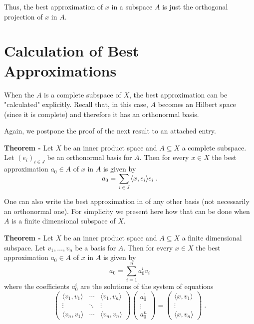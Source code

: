 \documentclass[12pt]{article}
\begin{document}
Thus, the best approximation of $x$ in a subspace $A$ is just the orthogonal projection of $x$ in $A$.

\section{Calculation of Best Approximations}
When the $A$ is a complete subspace of $X$, the best approximation can be "calculated" explicitly. Recall that, in this case, $A$ becomes an Hilbert space (since it is complete) and therefore it has an orthonormal basis.

Again, we postpone the proof of the next result to an attached entry.

{\bf Theorem -} Let $X$ be an inner product space and $A \subseteq X$ a complete subspace. Let $(e_i)_{i \in J}$ be an orthonormal basis for $A$. Then for every $x \in X$ the best approximation $a_0 \in A$ of $x$ in $A$ is given by
\begin{displaymath}
a_0= \sum_{i \in J} \langle x, e_i \rangle e_i \;.
\end{displaymath}

One can also write the best approximation in  of any other basis (not necessarily an orthonormal one). For simplicity we present here how that can be done when $A$ is a finite dimensional subspace of $X$.

{\bf Theorem -} Let $X$ be an inner product space and $A \subseteq X$ a finite dimensional subspace. Let $v_1, \dots, v_n$ be a basis for $A$. Then for every $x \in X$ the best approximation $a_0 \in A$ of $x$ in $A$ is given by
\begin{displaymath}
a_0 = \sum_{i=1}^{n} a_0^i v_i
\end{displaymath}
where the coefficients $a_0^i$ are the solutions of the system of equations
\begin{displaymath}
\begin{pmatrix}
\langle v_1, v_1 \rangle & \cdots & \langle v_1, v_n \rangle \\
\vdots & \ddots & \vdots \\
\langle v_n, v_1 \rangle & \cdots & \langle v_n, v_n \rangle
\end{pmatrix}
\begin{pmatrix}
a_0^1 \\
\vdots \\
a_0^n
\end{pmatrix} = 
\begin{pmatrix}
\langle x, v_1 \rangle\\
\vdots \\
\langle x, v_n \rangle
\end{pmatrix} \; .
\end{displaymath}
\end{document}
